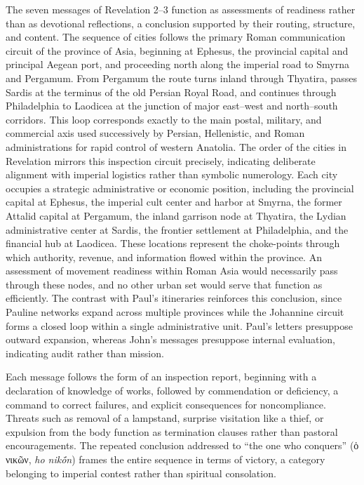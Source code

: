 The seven messages of Revelation 2--3 function as assessments of readiness rather than as devotional reflections, a conclusion supported by their routing, structure, and content.
The sequence of cities follows the primary Roman communication circuit of the province of Asia, beginning at Ephesus, the provincial capital and principal Aegean port, and proceeding north along the imperial road to Smyrna and Pergamum.
From Pergamum the route turns inland through Thyatira, passes Sardis at the terminus of the old Persian Royal Road, and continues through Philadelphia to Laodicea at the junction of major east--west and north--south corridors.
This loop corresponds exactly to the main postal, military, and commercial axis used successively by Persian, Hellenistic, and Roman administrations for rapid control of western Anatolia.
The order of the cities in Revelation mirrors this inspection circuit precisely, indicating deliberate alignment with imperial logistics rather than symbolic numerology.
Each city occupies a strategic administrative or economic position, including the provincial capital at Ephesus, the imperial cult center and harbor at Smyrna, the former Attalid capital at Pergamum, the inland garrison node at Thyatira, the Lydian administrative center at Sardis, the frontier settlement at Philadelphia, and the financial hub at Laodicea.
These locations represent the choke-points through which authority, revenue, and information flowed within the province.
An assessment of movement readiness within Roman Asia would necessarily pass through these nodes, and no other urban set would serve that function as efficiently.
The contrast with Paul's itineraries reinforces this conclusion, since Pauline networks expand across multiple provinces while the Johannine circuit forms a closed loop within a single administrative unit.
Paul's letters presuppose outward expansion, whereas John's messages presuppose internal evaluation, indicating audit rather than mission.

Each message follows the form of an inspection report, beginning with a declaration of knowledge of works, followed by commendation or deficiency, a command to correct failures, and explicit consequences for noncompliance.
Threats such as removal of a lampstand, surprise visitation like a thief, or expulsion from the body function as termination clauses rather than pastoral encouragements.
The repeated conclusion addressed to ``the one who conquers'' (ὁ νικῶν, \emph{ho nikṓn}) frames the entire sequence in terms of victory, a category belonging to imperial contest rather than spiritual consolation.

